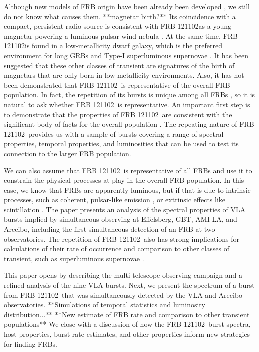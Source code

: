 \documentclass[twocolumn]{aastex61}
\newcommand{\frb}{FRB 121102}
\begin{document}
Although new models of FRB origin have been already been developed \citep{2017arXiv170104815K, 2017arXiv170102370M, 2017arXiv170104094Z, 2017arXiv170102492D}, we still do not know what causes them. 
**magnetar birth?**
Its coincidence with a compact, persistent radio source is consistent with \frb as a young magnetar powering a luminous pulsar wind nebula \citep{2017arXiv170104815K}. At the same time, \frb is found in a low-metallicity dwarf galaxy, which is the preferred environment for long GRBs and Type-I superluminous supernovae \citep[LGRB and SLSN-I, respectively;][]{2017arXiv170102370M}. It has been suggested that these other classes of transient are signatures of the birth of magnetars that are only born in low-metallicity environments.
Also, it has not been demonstrated that \frb\ is representative of the overall FRB population. In fact, the repetition of its bursts is unique among all FRBs \citep{2015MNRAS.454..457P}, so it is natural to ask whether \frb\ is representative. An important first step is to demonstrate that the properties of \frb\ are consistent with the significant body of facts for the overall population \citep{2015MNRAS.451.3278M, 2016MPLA...3130013K}. The repeating nature of \frb\ provides us with a sample of bursts covering a range of spectral properties, temporal properties, and luminosities that can be used to test its connection to the larger FRB population.

We can also assume that \frb\ is representative of all FRBs and use it to constrain the physical processes at play in the overall FRB population. In this case, we know that FRBs are apparently luminous, but if that is due to intrinsic processes, such as coherent, pulsar-like emission \citep{2014PhRvD..89j3009K, 2014ApJ...785L..26L, 2016MNRAS.457..232C}, or extrinsic effects like scintillation \citep{CORDES}. The paper presents an analysis of the spectral properties of VLA bursts implied by simultaneous observing at Effelsberg, GBT, AMI-LA, and Arecibo, including the first simultaneous detection of an FRB at two observatories. The repetition of \frb\ also has strong implications for calculations of their rate of occurrence \citep{2016MNRAS.458L..89C} and comparison to other classes of transient, such as superluminous supernovae \citep{OPT}.

This paper opens by describing the multi-telescope observing campaign and a refined analysis of the nine VLA bursts. Next, we present the spectrum of a burst from \frb\ that was simultaneously detected by the VLA and Arecibo observatories. **Simulations of temporal statistics and luminosity distribution...** **New estimate of FRB rate and comparison to other transient populations** We close with a discussion of how the \frb\ burst spectra, host properties, burst rate estimates, and other properties inform new strategies for finding FRBs.
\end{document}
